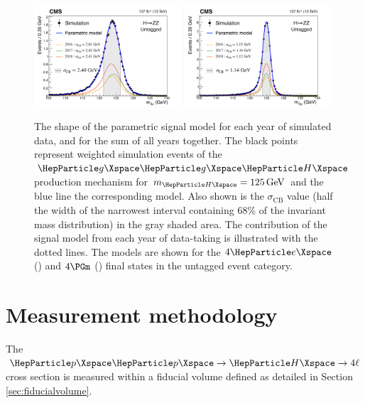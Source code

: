 \begin{figure}[!htb]
	\centering
	\includegraphics[width=0.49\textwidth]{Images/H4L/Signal/HZZ4e_lineshape.pdf}
	\includegraphics[width=0.49\textwidth]{Images/H4L/Signal/HZZ4mu_lineshape.pdf}
	\caption{
		The shape of the parametric signal model for each year of simulated data, and for the sum of all years together.
		The black points represent weighted simulation events of the $\ggH$ production mechanism for $\mH=125\GeV$ and the blue line the corresponding model.
		Also shown is the $\sigma_{\text{CB}}$ value (half the width of the narrowest interval containing 68\% of the invariant mass distribution) in the gray shaded area.
		The contribution of the signal model from each year of data-taking is illustrated with the dotted lines.
		The models are shown for the $4\Pe$ (\cmsLeft) and $4\Pgm$ (\cmsRight) final states in the untagged event category.
		\label{fig:signal_fit}}
\end{figure}

\section{Measurement methodology}
\label{sec:measurement}

The $\Pp\Pp\to\Hllll$ cross section is measured within a fiducial volume defined as detailed in Section \ref{sec:fiducialvolume}.

